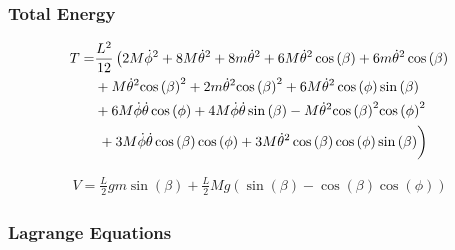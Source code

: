  \subsubsection{Total Energy}

 \begin{equation}
    \begin{split}
        T = &\frac{L^2}{12}\left(2M{\mathrm{\dot\phi}}^2+8M{\mathrm{\dot\theta}}^2+8m{\mathrm{\dot\theta}}^2+6M{\mathrm{\dot\theta}}^2\cos\left(\beta \right)+6m{\mathrm{\dot\theta}}^2\cos\left(\beta \right)\right.\\
        &+M{\mathrm{\dot\theta}}^2{\cos\left(\beta \right)}^2+2m{\mathrm{\dot\theta}}^2{\cos\left(\beta \right)}^2+6M{\mathrm{\dot\theta}}^2\cos\left(\phi \right)\sin\left(\beta \right)\\
        &+6M\mathrm{\dot\phi}\mathrm{\dot\theta}\cos\left(\phi \right)+4M\mathrm{\dot\phi}\mathrm{\dot\theta}\sin\left(\beta \right)-M{\mathrm{\dot\theta}}^2{\cos\left(\beta \right)}^2{\cos\left(\phi \right)}^2\\
        &\left.\vphantom{\int}+3M\mathrm{\dot\phi}\mathrm{\dot\theta}\cos\left(\beta \right)\cos\left(\phi \right)+3M{\mathrm{\dot\theta}}^2\cos\left(\beta \right)\cos\left(\phi \right)\sin\left(\beta \right)\right)
    \end{split}
 \end{equation}

 \begin{equation}
    \begin{split}
        V = \frac{L}{2}gm\sin\left(\beta \right)+\frac{L}{2}Mg\left(\sin\left(\beta \right)-\cos\left(\beta \right)\cos\left(\phi \right)\right)
    \end{split}
 \end{equation}

 \subsubsection{Lagrange Equations}



